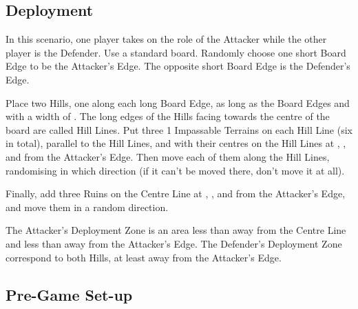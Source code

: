 
\label{IntheMountains}


\subsection*{Deployment}

In this scenario, one player takes on the role of the Attacker while the other player is the Defender. Use a standard \timess{} board. Randomly choose one short Board Edge to be the Attacker's Edge. The opposite short Board Edge is the Defender's Edge.

Place two Hills, one along each long Board Edge, as long as the Board Edges and with a width of . The long edges of the Hills facing towards the centre of the board are called Hill Lines. Put three 1\timess{} Impassable Terrains on each Hill Line (six in total), parallel to the Hill Lines, and with their centres on the Hill Lines at , , and  from the Attacker's Edge. Then move each of them  along the Hill Lines, randomising in which direction (if it can't be moved there, don't move it at all).

Finally, add three Ruins on the Centre Line at , , and  from the Attacker's Edge, and move them  in a random direction.

The Attacker's Deployment Zone is an area less than  away from the Centre Line and less than  away from the Attacker's Edge. The Defender's Deployment Zone correspond to both Hills, at least  away from the Attacker's Edge.

\newcommand{\figTwelveDefender}{{\Largefontsize{Defender}}}
\newcommand{\figTwelveAttacker}{{\Largefontsize{Attacker}}}
\newcommand{\repeatthreetimes}{repeat 3\timess{}}
\newcommand{\repeatsixtimes}{repeat 6\timess{}}

\newpage
\subsection*{Pre-Game Set-up}

